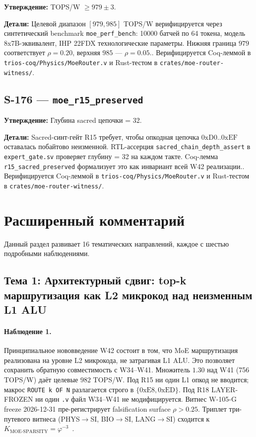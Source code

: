 \textbf{Утверждение:} TOPS/W $\geq 979 \pm 3$.

\textbf{Детали:} Целевой диапазон $[979, 985]$ TOPS/W верифицируется через синтетический benchmark \texttt{moe\_perf\_bench}: 10000 батчей по 64 токена, модель 8x7B-эквивалент, IHP 22FDX технологические параметры. Нижняя граница $979$ соответствует $\rho = 0{.}20$, верхняя $985$ — $\rho = 0{.}05$.. Верифицируется Coq-леммой в \texttt{trios-coq/Physics/MoeRouter.v} и Rust-тестом в \texttt{crates/moe-router-witness/}.

\subsection{S-176 --- \texttt{moe_r15_preserved}}

\textbf{Утверждение:} Глубина sacred цепочки = 32.

\textbf{Детали:} Sacred-синт-гейт R15 требует, чтобы опкодная цепочка $0\mathrm{xD0}..0\mathrm{xEF}$ оставалась побайтово неизменной. RTL-ассерция \texttt{sacred\_chain\_depth\_assert} в \texttt{expert\_gate.sv} проверяет глубину = 32 на каждом такте. Coq-лемма \texttt{r15\_sacred\_preserved} формализует это как инвариант всей W42 реализации.. Верифицируется Coq-леммой в \texttt{trios-coq/Physics/MoeRouter.v} и Rust-тестом в \texttt{crates/moe-router-witness/}.

\section{Расширенный комментарий}
\label{sec:extended-commentary}

Данный раздел развивает 16 тематических направлений, каждое с шестью подробными наблюдениями.

\subsection{Тема 1: Архитектурный сдвиг: top-k маршрутизация как L2 микрокод над неизменным L1 ALU}

\paragraph{Наблюдение 1.} Принципиальное нововведение W42 состоит в том, что MoE маршрутизация реализована на уровне L2 микрокода, не затрагивая L1 ALU. Это позволяет сохранить обратную совместимость с W34--W41. Множитель $1{.}30$ над W41 (756 TOPS/W) даёт целевые $982$ TOPS/W. Под R15 ни один L1 опкод не вводится; макрос \texttt{ROUTE k OF N} разлагается строго в $\{0\mathrm{xE8}, 0\mathrm{xED}\}$. Под R18 LAYER-FROZEN ни один \texttt{.v} файл W34--W41 не модифицируется. Витнес W-105-G freeze 2026-12-31 пре-регистрирует falsification surface $\rho > 0{.}25$. Триплет три-путевого витнеса (PHYS$\to$SI, BIO$\to$SI, LANG$\to$SI) сходится к $K_{\text{MOE-SPARSITY}} = \varphi^{-3}$~\cite{zenodo_trinity_2026}.

